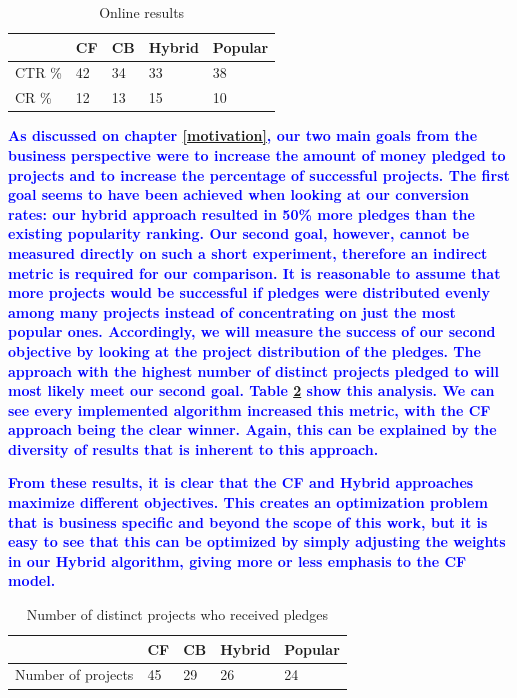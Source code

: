 \documentclass[cic,tc,english]{iiufrgs}
\newcommand{\adriano}[1]{\textcolor{blue}{\textbf{#1}}}
\begin{document}
\begin{table}[ht!]
\centering
\caption{Online results}
\label{online-results}
\begin{tabular}{|l|l|l|l|l|}
\hline
    & CF & CB & Hybrid & Popular \\ \hline
CTR \% & 42 & 34 & 33     & 38      \\ \hline
CR \% & 12 & 13 & 15     & 10      \\ \hline
\end{tabular}
\end{table}

\adriano{As discussed on chapter \ref{motivation}, our two main goals from the business perspective were to increase the amount of money pledged to projects and to increase the percentage of successful projects. The first goal seems to have been achieved when looking at our conversion rates: our hybrid approach resulted in 50\% more pledges than the existing popularity ranking. Our second goal, however, cannot be measured directly on such a short experiment, therefore an indirect metric is required for our comparison. It is reasonable to assume that more projects would be successful if pledges were distributed evenly among many projects instead of concentrating on just the most popular ones. Accordingly, we will measure the success of our second objective by looking at the project distribution of the pledges. The approach with the highest number of distinct projects pledged to will most likely meet our second goal. Table \ref{distinct-projects} show this analysis. We can see every implemented algorithm increased this metric, with the CF approach being the clear winner. Again, this can be explained by the diversity of results that is inherent to this approach.}

\adriano{From these results, it is clear that the CF and Hybrid approaches maximize different objectives. This creates an optimization problem that is business specific and beyond the scope of this work, but it is easy to see that this can be optimized by simply adjusting the weights in our Hybrid algorithm, giving more or less emphasis to the CF model.}

\begin{table}[ht!]
\centering
\caption{Number of distinct projects who received pledges}
\label{distinct-projects}
\begin{tabular}{|l|l|l|l|l|}
\hline
                   & CF & CB & Hybrid & Popular \\ \hline
Number of projects & 45 & 29 & 26     & 24      \\ \hline
\end{tabular}
\end{table}
\end{document}
